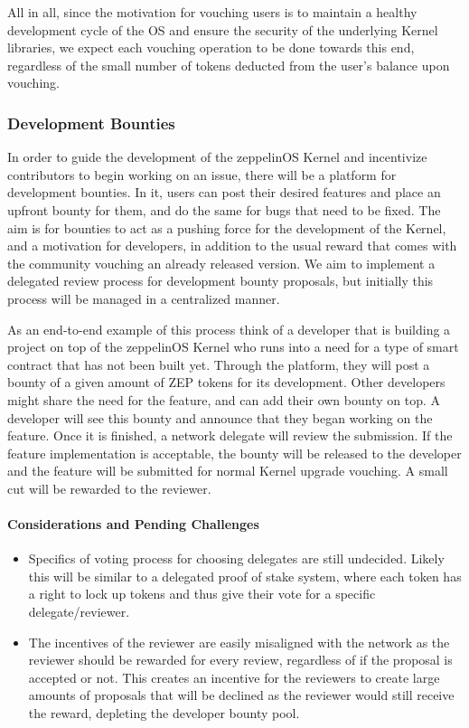 \documentclass[]{article}
\makeatletter
\let\oldparagraph\paragraph
\renewcommand{\paragraph}[1]{\oldparagraph{#1}\mbox{}}
\DeclareRobustCommand{\_}{%
  \leavevmode\vbox{%
    \hrule\@width.5em
          \@height-.26ex
          \@depth\dimexpr.26ex+.28pt\relax}}
\makeatother
\begin{document}
All in all, since the motivation for vouching users is to maintain a
healthy development cycle of the OS and ensure the security of the
underlying Kernel libraries, we expect each vouching operation to be
done towards this end, regardless of the small number of tokens deducted
from the user's balance upon vouching.

\subsubsection{Development Bounties}

In order to guide the development of the zeppelinOS Kernel and
incentivize contributors to begin working on an issue, there will be a
platform for development bounties. In it, users can post their desired
features and place an upfront bounty for them, and do the same for bugs
that need to be fixed. The aim is for bounties to act as a pushing force
for the development of the Kernel, and a motivation for developers, in
addition to the usual reward that comes with the community vouching an
already released version. We aim to implement a delegated review process
for development bounty proposals, but initially this process will be
managed in a centralized manner.

As an end-to-end example of this process think of a developer that is
building a project on top of the zeppelinOS Kernel who runs into a need
for a type of smart contract that has not been built yet. Through the
platform, they will post a bounty of a given amount of ZEP tokens for
its development. Other developers might share the need for the feature,
and can add their own bounty on top. A developer will see this bounty
and announce that they began working on the feature. Once it is
finished, a network delegate will review the
submission. If
the feature implementation is acceptable, the bounty will be released to
the developer and the feature will be submitted for normal Kernel
upgrade vouching. A small cut will be rewarded to the reviewer.

\paragraph{Considerations and Pending Challenges}

\begin{itemize}
  \item
    Specifics of voting process for choosing delegates are still
    undecided. Likely this will be similar to a delegated proof of stake
    system, where each token has a right to lock up tokens and thus give
    their vote for a specific delegate/reviewer.
  \item
    The incentives of the reviewer are easily misaligned with the network
    as the reviewer should be rewarded for every review, regardless of if
    the proposal is accepted or not. This creates an incentive for the
    reviewers to create large amounts of proposals that will be declined
    as the reviewer would still receive the reward, depleting the
    developer bounty
    pool.
\end{itemize}
\end{document}
